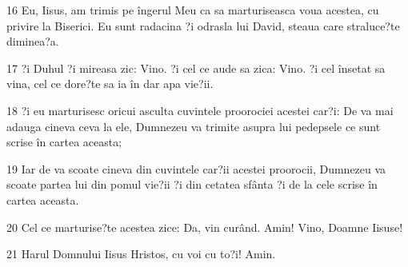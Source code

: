 \par 16 Eu, Iisus, am trimis pe îngerul Meu ca sa marturiseasca voua acestea, cu privire la Biserici. Eu sunt radacina ?i odrasla lui David, steaua care straluce?te diminea?a.
\par 17 ?i Duhul ?i mireasa zic: Vino. ?i cel ce aude sa zica: Vino. ?i cel însetat sa vina, cel ce dore?te sa ia în dar apa vie?ii.
\par 18 ?i eu marturisesc oricui asculta cuvintele proorociei acestei car?i: De va mai adauga cineva ceva la ele, Dumnezeu va trimite asupra lui pedepsele ce sunt scrise în cartea aceasta;
\par 19 Iar de va scoate cineva din cuvintele car?ii acestei proorocii, Dumnezeu va scoate partea lui din pomul vie?ii ?i din cetatea sfânta ?i de la cele scrise în cartea aceasta.
\par 20 Cel ce marturise?te acestea zice: Da, vin curând. Amin! Vino, Doamne Iisuse!
\par 21 Harul Domnului Iisus Hristos, cu voi cu to?i! Amin.


